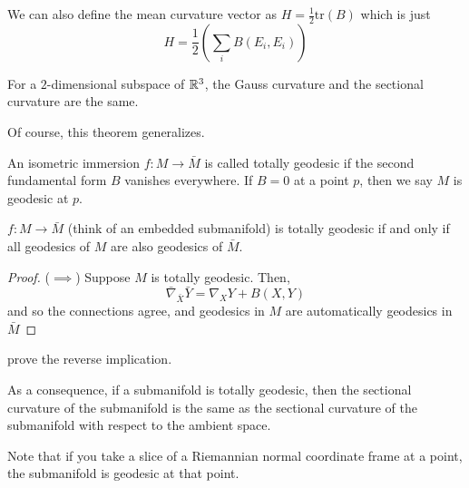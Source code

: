 \documentclass[../main.tex]{subfiles}
\begin{document}
We can also define the mean curvature vector as $H = \frac{1}{2}\text{tr}(B)$
which is just
\[
    H = \frac{1}{2}(\sum_iB(E_i,E_i))
\]

For a $2$-dimensional subspace of $\mathbb{R}^3$, the Gauss curvature and the sectional
curvature are the same.

Of course, this theorem generalizes.

\begin{defn}
    An isometric immersion $f:M\to \bar{M}$ is called totally geodesic if the
    second fundamental form $B$ vanishes everywhere. If $B=0$ at a point $p$,
    then we say $M$ is geodesic at $p$.
\end{defn}

\begin{theorem}
    $f:M\to \bar{M}$ (think of an embedded submanifold) is totally geodesic if
    and only if all geodesics of $M$ are also geodesics of $\bar{M}$.
\end{theorem}

\begin{proof}
    ($\implies$) Suppose $M$ is totally geodesic. Then, 
    \[
        \bar{\nabla}_{\bar{X}}\bar{Y} = \nabla_XY +B(X,Y)
    \]
    and so the connections agree, and geodesics in $M$ are automatically
    geodesics in $\bar{M}$
\end{proof}
\begin{hw}
    prove the reverse implication.
\end{hw}

As a consequence, if a submanifold is totally geodesic, then the sectional
curvature of the submanifold is the same as the sectional curvature of the
submanifold with respect to the ambient space.

Note that if you take a slice of a Riemannian normal coordinate frame at a
point, the submanifold is geodesic at that point.
\end{document}

